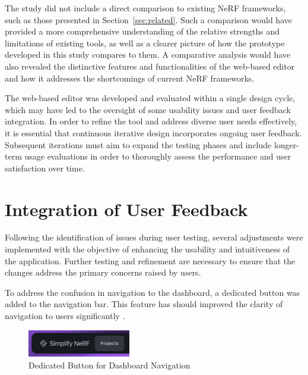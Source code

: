 The study did not include a direct comparison to existing NeRF frameworks, such as those presented in Section~\ref{sec:related}.
Such a comparison would have provided a more comprehensive understanding of the relative strengths and limitations of existing tools, as well as a clearer picture of how the prototype developed in this study compares to them.
A comparative analysis would have also revealed the distinctive features and functionalities of the web-based editor and how it addresses the shortcomings of current NeRF frameworks.

The web-based editor was developed and evaluated within a single design cycle, which may have led to the oversight of some usability issues and user feedback integration.
In order to refine the tool and address diverse user needs effectively, it is essential that continuous iterative design incorporates ongoing user feedback.
Subsequent iterations must aim to expand the testing phases and include longer-term usage evaluations in order to thoroughly assess the performance and user satisfaction over time.

\section{Integration of User Feedback}
\label{sec:discussion:user-feedback}

Following the identification of issues during user testing, several adjustments were implemented with the objective of enhancing the usability and intuitiveness of the application.
Further testing and refinement are necessary to ensure that the changes address the primary concerns raised by users.

To address the confusion in navigation to the dashboard, a dedicated button was added to the navigation bar.
This feature has should improved the clarity of  navigation to users significantly .

\begin{figure}[htb]
  \centering
	\includegraphics[width=0.4\textwidth]{figures/fix-1.png}
	\caption{Dedicated Button for Dashboard Navigation}
  \label{fig:fix-1}
\end{figure}

